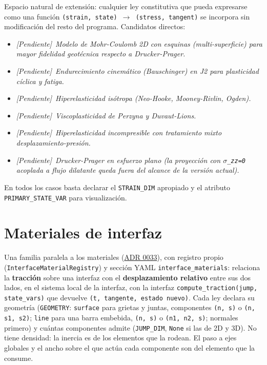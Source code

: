 \documentclass[11pt,oneside]{report}
\newcommand{\pendiente}[1]{\textcolor{pendienteorange}{\textit{[Pendiente]}~\textcolor{pendienteorange}{\textit{#1}}}}
\begin{document}
Espacio natural de extensión: cualquier ley constitutiva que pueda expresarse como una función \texttt{(strain, state) \ensuremath{\to} (stress, tangent)} se incorpora sin modificación del resto del programa. Candidatos directos:

\begin{itemize}
  \item \pendiente{Modelo de Mohr-Coulomb 2D con esquinas (multi-superficie) para mayor fidelidad geotécnica respecto a Drucker-Prager.}
  \item \pendiente{Endurecimiento cinemático (Bauschinger) en J2 para plasticidad cíclica y fatiga.}
  \item \pendiente{Hiperelasticidad isótropa (Neo-Hooke, Mooney-Rivlin, Ogden).}
  \item \pendiente{Viscoplasticidad de Perzyna y Duvaut-Lions.}
  \item \pendiente{Hiperelasticidad incompresible con tratamiento mixto desplazamiento-presión.}
  \item \pendiente{Drucker-Prager en esfuerzo plano (la proyección con \texttt{\ensuremath{\sigma}\_zz=0} acoplada a flujo dilatante queda fuera del alcance de la versión actual).}
\end{itemize}

En todos los casos basta declarar el \texttt{STRAIN\_DIM} apropiado y el atributo \texttt{PRIMARY\_\allowbreak{}STATE\_\allowbreak{}VAR} para visualización.

\section{Materiales de interfaz}

Una familia paralela a los materiales (\hyperref[adr:0033]{ADR 0033}), con registro propio (\texttt{InterfaceMaterialRegistry}) y sección YAML \texttt{interface\_\allowbreak{}materials}: relaciona la \textbf{tracción} sobre una interfaz con el \textbf{desplazamiento relativo} entre sus dos lados, en el sistema local de la interfaz, con la interfaz \texttt{compute\_\allowbreak{}traction(jump, state\_\allowbreak{}vars)} que devuelve \texttt{(t, tangente, estado nuevo)}. Cada ley declara su geometría (\texttt{GEOMETRY}: \texttt{\textquotedbl{}surface\textquotedbl{}} para grietas y juntas, componentes \texttt{(n, s)} o \texttt{(n, s1, s2)}; \texttt{\textquotedbl{}line\textquotedbl{}} para una barra embebida, \texttt{(n, s)} o \texttt{(n1, n2, s)}; normales primero) y cuántas componentes admite (\texttt{JUMP\_DIM}, \texttt{None} si las de 2D y 3D). No tiene densidad: la inercia es de los elementos que la rodean. El paso a ejes globales y el ancho sobre el que actúa cada componente son del elemento que la consume.
\end{document}
